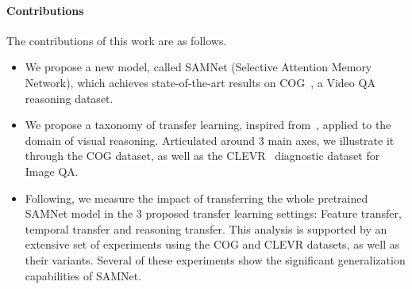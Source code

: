 \paragraph{Contributions}
The contributions of this work are as follows.
\begin{itemize}
	\compresslist
	\item We propose a new model, called SAMNet (Selective Attention Memory Network), which achieves state-of-the-art results on COG~\cite{yang2018dataset}, a Video QA reasoning dataset.
	\item We propose a taxonomy of transfer learning, inspired from~\cite{pan2009survey}, applied to the domain of visual reasoning. Articulated around 3 main axes, we illustrate it through the COG dataset, as well as the CLEVR~\cite{johnson2017clevr} diagnostic dataset for Image QA.
	\item Following, we measure the impact of transferring the whole pretrained SAMNet model in the 3 proposed transfer learning settings: Feature transfer, temporal transfer and reasoning transfer. This analysis is supported by an extensive set of experiments using the COG and CLEVR datasets, as well as their variants. Several of these experiments show the significant generalization capabilities of SAMNet.
\end{itemize}


